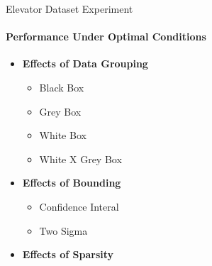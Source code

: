 \documentclass{beamer}
\begin{document}
\begin{frame}[t]{Elevator Dataset Experiment}
  \framesubtitle{Performance Under Optimal Conditions}
  \begin{itemize}
    \setlength\itemsep{1em}

  \item \textbf{Effects of Data Grouping}
    \begin{itemize}
      \item Black Box
      \item Grey Box
      \item White Box
      \item White X Grey Box
    \end{itemize}
  \item \textbf{Effects of Bounding}
    \begin{itemize}
      \item Confidence Interal
      \item Two Sigma
    \end{itemize}
  \item \textbf{Effects of Sparsity}
  \end{itemize}
\end{frame}
\end{document}
